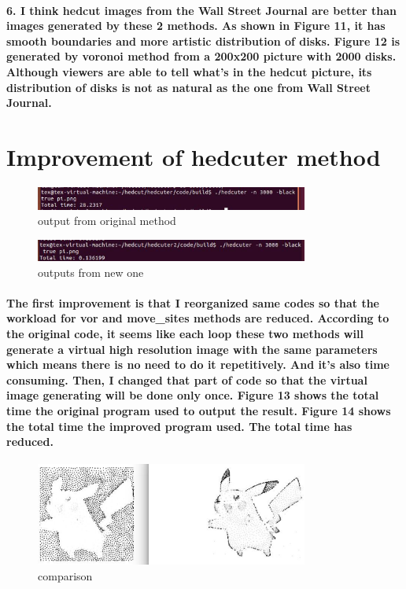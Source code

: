 \documentclass[11pt]{article}
\begin{document}
\paragraph{6. I think hedcut images from the Wall Street Journal are better than images generated by these 2 methods. As shown in Figure 11, it has smooth boundaries and more artistic distribution of disks. Figure 12 is generated by voronoi method from a 200x200 picture with 2000 disks. Although viewers are able to tell what's in the hedcut picture, its distribution of disks is not as natural as the one from Wall Street Journal.}
\section{Improvement of hedcuter method}
\begin{figure}[h!]
\centering
\includegraphics[width=0.80\textwidth]{figure13.eps}
\caption{output from original method}
\label{threadsVsSync}
\end{figure}
\begin{figure}[h!]
\centering
\includegraphics[width=0.80\textwidth]{figure14.eps}
\caption{outputs from new one}
\label{threadsVsSync}
\end{figure}
\paragraph{The first improvement is that I reorganized same codes so that the workload for vor and move\_sites methods are reduced. According to the original code, it seems like  each loop these two methods will generate a virtual high resolution image with the same parameters which means there is no need to do it repetitively. And it's also time consuming. Then, I changed that part of code so that the virtual image generating will be done only once. Figure 13 shows the total time the original program used to output the result. Figure 14 shows the total time the improved program used. The total time has reduced.}
\begin{figure}[h!]
\centering
\includegraphics[width=0.80\textwidth]{figure15.eps}
\caption{comparison}
\label{threadsVsSync}
\end{figure}
\end{document}
